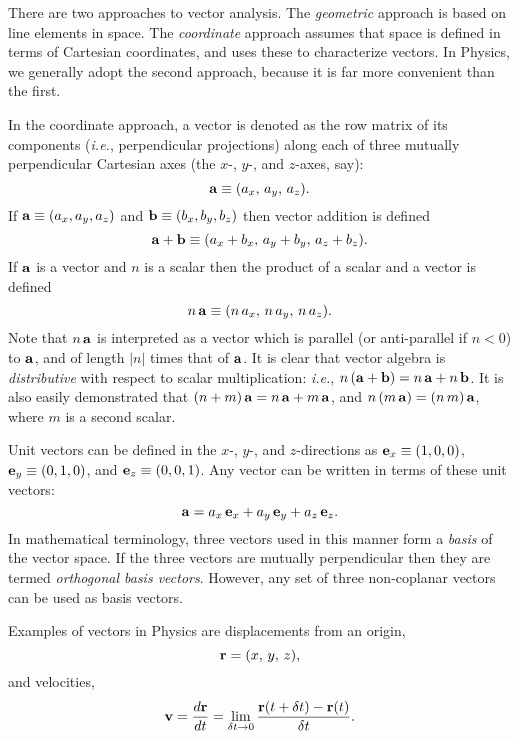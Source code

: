 There are two  approaches to vector analysis. The {\em geometric}\/ approach is
based on line elements in space. The {\em coordinate}\/ approach assumes that
space is defined in terms of Cartesian coordinates, and uses these to characterize vectors.
In Physics, we generally
adopt the second approach, because it is far more convenient than the first.

In the coordinate approach, a vector is  denoted as the row matrix of
its components ({\em i.e.}, perpendicular projections) along each of three mutually perpendicular Cartesian axes (the $x$-, $y$-, and $z$-axes, say):
\begin{equation}
{\bf a} \equiv (a_x,\, a_y,\, a_z).
\end{equation}
If ${\bf a} \equiv (a_x, a_y, a_z)$ and ${\bf b} \equiv (b_x, b_y, b_z)$
then vector addition is defined
\begin{equation}
{\bf a} + {\bf b} \equiv (a_x+b_x,\, a_y+b_y,\, a_z+b_z).
\end{equation}
If ${\bf a}$ is a vector and $n$ is a scalar then the product 
of a scalar and a vector is defined
\begin{equation}
n\,{\bf a} \equiv (n\,a_x,\, n\,a_y,\, n\,a_z).
\end{equation}
Note that $n\,{\bf a}$ is interpreted as a vector which is
parallel (or anti-parallel if $n<0$) to ${\bf a}$, and of length
$|n|$ times that of ${\bf a}$. 
It is clear that vector algebra is {\em distributive} with respect to
scalar multiplication: {\em i.e.},  $n\,({\bf a} + {\bf b}) = n\,{\bf a} + n\,{\bf b}$. It is also easily demonstrated that $(n+m)\,{\bf a}= n\,{\bf a}+ m\,{\bf a}$, and $n\,(m\,{\bf a}) = (n\,m)\,{\bf a}$, where $m$ is a second scalar.

Unit vectors can be defined in the $x$-, $y$-, and $z$-directions as
${\bf e}_x \equiv (1,0,0)$, ${\bf e}_y \equiv (0,1,0)$, and ${\bf e}_z \equiv
(0,0,1)$. Any vector can be written in terms of these unit vectors:
\begin{equation}
{\bf a} = a_x\, {\bf e}_x + a_y \,{\bf e}_y + a_z\,{\bf e}_z.
\end{equation}
In mathematical terminology,
three vectors used in this manner form a {\em basis} of the vector space. If the
three vectors are mutually perpendicular then they are termed {\em orthogonal basis
vectors}. However, any set of three non-coplanar vectors can be used as basis
vectors.

Examples of vectors in Physics are displacements from an origin,
\begin{equation}
{\bf r} = (x,\, y,\, z),
\end{equation}
and velocities,
\begin{equation}
{\bf v} = \frac{d {\bf r}}{dt} = \lim_{\delta t\rightarrow 0} 
\frac{ {\bf r}(t+\delta t) - {\bf r}(t) }{\delta t}.
\end{equation}

